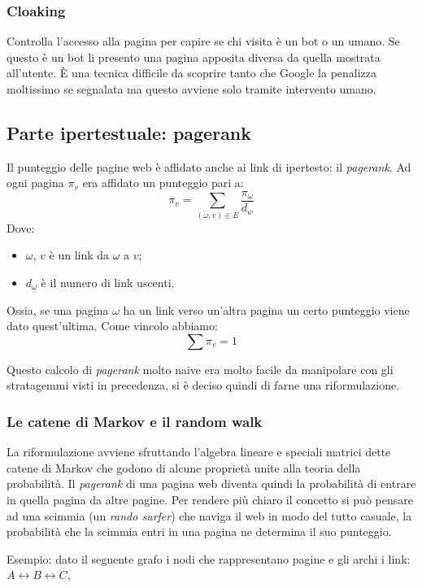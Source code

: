 			\subsubsection{Cloaking}
				Controlla l'accesso alla pagina per capire se chi visita è un bot o un umano. Se questo è un bot li presento una pagina apposita diversa da quella mostrata all'utente. È una tecnica difficile da scoprire tanto che Google la penalizza moltissimo se segnalata ma questo avviene solo tramite intervento umano.
			
	
		\subsection{Parte ipertestuale: pagerank}
			Il punteggio delle pagine web è affidato anche ai link di ipertesto: il \emph{pagerank}. Ad ogni pagina $\pi_v$ era affidato un punteggio pari a:
				\[
					\pi_v=\sum_{(\omega, v) \in E}\frac{\pi_{\omega}}{d_w}
				\]
			Dove:
			\begin{itemize}
				\item $\omega$, $v$ è un link da $\omega$ a $v$;
				\item $d_\omega$ è il numero di link uscenti.
			\end{itemize}
			Ossia, se una pagina $\omega$ ha un link verso un'altra pagina un certo punteggio viene dato quest'ultima.
			Come vincolo abbiamo:
			\[
				\sum\pi_v=1
			\]
			
			Questo calcolo di \emph{pagerank} molto naive era molto facile da manipolare con gli stratagemmi visti in precedenza, si è deciso quindi di farne una riformulazione.
		
			\subsubsection{Le catene di Markov e il random walk}
				La riformulazione avviene sfruttando l'algebra lineare e speciali matrici dette catene di Markov che godono di alcune proprietà unite alla teoria della probabilità. Il \emph{pagerank} di una pagina web diventa quindi la probabilità di entrare in quella pagina da altre pagine.
				Per rendere più chiaro il concetto si può pensare ad una scimmia  (un \emph{rando surfer}) che naviga il web in modo del tutto casuale, la probabilità che la scimmia entri in una pagina ne determina il suo punteggio.
				
				Esempio:
					dato il seguente grafo i nodi che rappresentano pagine e gli archi i link:
					$A \longleftrightarrow B \longleftrightarrow C$,
					
